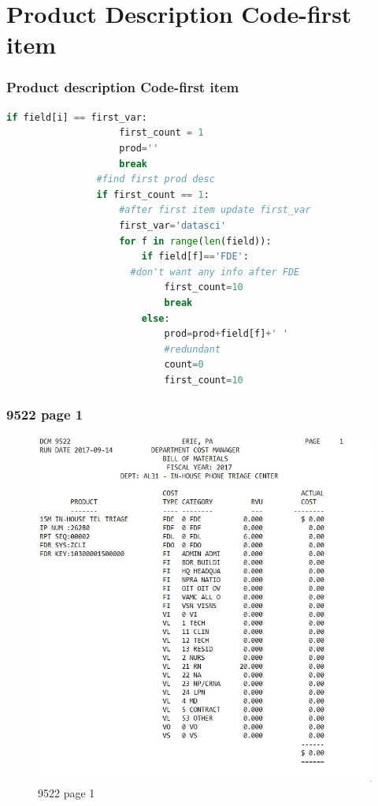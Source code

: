 \documentclass{beamer}\usepackage[]{graphicx}\usepackage[]{color}
\begin{document}
\section{Product Description Code-first item}
\begin{frame}[fragile]
  \frametitle{Product description Code-first item}

\begin{lstlisting}[language=Python]
                if field[i] == first_var:
                    first_count = 1
                    prod=''
                    break          
                #find first prod desc
                if first_count == 1:
                    #after first item update first_var
                    first_var='datasci'
                    for f in range(len(field)):
                        if field[f]=='FDE':
                      #don't want any info after FDE
                            first_count=10
                            break
                        else:
                            prod=prod+field[f]+' '
                            #redundant
                            count=0
                            first_count=10
\end{lstlisting}


\end{frame}

\begin{frame}[fragile]
  \frametitle{9522 page 1}
  
\begin{figure}
\includegraphics[scale=0.4]{9522_page1}
\caption{9522 page 1}
\end{figure}
  
\end{frame}
\end{document}
